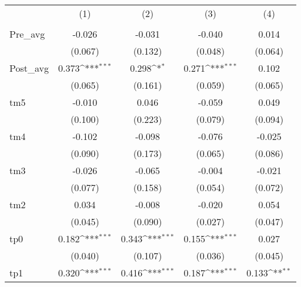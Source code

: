 {
\def\sym#1{\ifmmode^{#1}\else\(^{#1}\)\fi}
\begin{tabular}{l*{4}{c}}
\hline\hline
                    &\multicolumn{1}{c}{(1)}&\multicolumn{1}{c}{(2)}&\multicolumn{1}{c}{(3)}&\multicolumn{1}{c}{(4)}\\
                    &\multicolumn{1}{c}{} &\multicolumn{1}{c}{} &\multicolumn{1}{c}{} &\multicolumn{1}{c}{} \\
\hline
Pre\_avg             &      -0.026         &      -0.031         &      -0.040         &       0.014         \\
                    &     (0.067)         &     (0.132)         &     (0.048)         &     (0.064)         \\
[1em]
Post\_avg            &       0.373\sym{***}&       0.298\sym{*}  &       0.271\sym{***}&       0.102         \\
                    &     (0.065)         &     (0.161)         &     (0.059)         &     (0.065)         \\
[1em]
tm5                 &      -0.010         &       0.046         &      -0.059         &       0.049         \\
                    &     (0.100)         &     (0.223)         &     (0.079)         &     (0.094)         \\
[1em]
tm4                 &      -0.102         &      -0.098         &      -0.076         &      -0.025         \\
                    &     (0.090)         &     (0.173)         &     (0.065)         &     (0.086)         \\
[1em]
tm3                 &      -0.026         &      -0.065         &      -0.004         &      -0.021         \\
                    &     (0.077)         &     (0.158)         &     (0.054)         &     (0.072)         \\
[1em]
tm2                 &       0.034         &      -0.008         &      -0.020         &       0.054         \\
                    &     (0.045)         &     (0.090)         &     (0.027)         &     (0.047)         \\
[1em]
tp0                 &       0.182\sym{***}&       0.343\sym{***}&       0.155\sym{***}&       0.027         \\
                    &     (0.040)         &     (0.107)         &     (0.036)         &     (0.045)         \\
[1em]
tp1                 &       0.320\sym{***}&       0.416\sym{***}&       0.187\sym{***}&       0.133\sym{**} \\

\end{tabular}}
